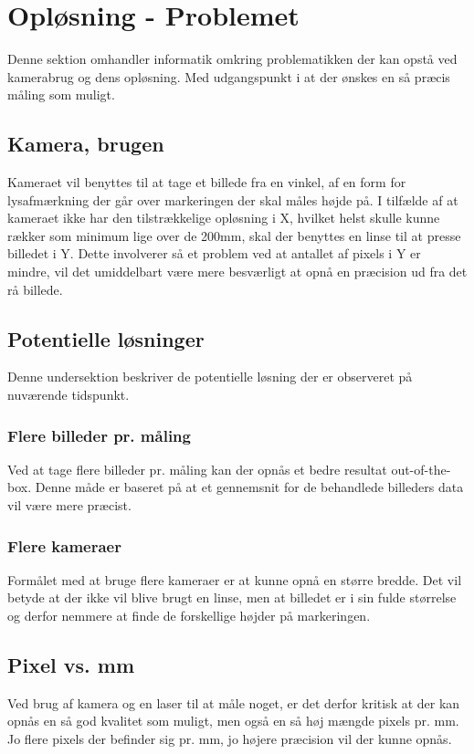 \section{Opløsning - Problemet}

Denne sektion omhandler informatik omkring problematikken der kan opstå ved kamerabrug og dens opløsning. Med udgangspunkt i at der ønskes en så præcis måling som muligt.

\subsection{Kamera, brugen}
Kameraet vil benyttes til at tage et billede fra en vinkel, af en form for lysafmærkning der går over markeringen der skal måles højde på. I tilfælde af at kameraet ikke har den tilstrækkelige opløsning i X, hvilket helst skulle kunne rækker som minimum lige over de 200mm, skal der benyttes en linse til at presse billedet i Y. Dette involverer så et problem ved at antallet af pixels i Y er mindre, vil det umiddelbart være mere besværligt at opnå en præcision ud fra det rå billede.

\subsection{Potentielle løsninger}

Denne undersektion beskriver de potentielle løsning der er observeret på nuværende tidspunkt.

\subsubsection{Flere billeder pr. måling}

Ved at tage flere billeder pr. måling kan der opnås et bedre resultat out-of-the-box. Denne måde er baseret på at et gennemsnit for de behandlede billeders data vil være mere præcist.

\subsubsection{Flere kameraer}
Formålet med at bruge flere kameraer er at kunne opnå en større bredde. Det vil betyde at der ikke vil blive brugt en linse, men at billedet er i sin fulde størrelse og derfor nemmere at finde de forskellige højder på markeringen.

\subsection{Pixel vs. mm}
Ved brug af kamera og en laser til at måle noget, er det derfor kritisk at der kan opnås en så god kvalitet som muligt, men også en så høj mængde pixels pr. mm. Jo flere pixels der befinder sig pr. mm, jo højere præcision vil der kunne opnås.

